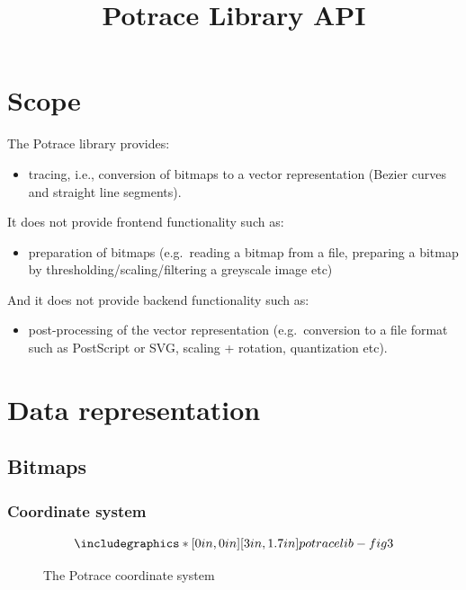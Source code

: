 \documentclass{article}
\title{Potrace Library API}
\author{}
\date{}
\begin{document}
\maketitle


\section{Scope}

The Potrace library provides:

\begin{itemize}
\item tracing, i.e., conversion of bitmaps to a vector representation
  (Bezier curves and straight line segments).
\end{itemize}
It does not provide frontend functionality such as:

\begin{itemize}
\item preparation of bitmaps (e.g.\ reading a bitmap from a file, preparing
  a bitmap by thresholding/scaling/filtering a greyscale image etc)
\end{itemize}
And it does not provide backend functionality such as:

\begin{itemize}
\item post-processing of the vector representation (e.g.\ conversion to a
  file format such as PostScript or SVG, scaling + rotation,
  quantization etc).
\end{itemize}

\section{Data representation}

\subsection{Bitmaps}\label{ssec-bitmap}

\subsubsection{Coordinate system}

\begin{figure}[t]
\[ \includegraphics*[0in,0in][3in,1.7in]{potracelib-fig3}
\]
\caption{The Potrace coordinate system}\label{fig-coord}
\end{figure}
\end{document}
